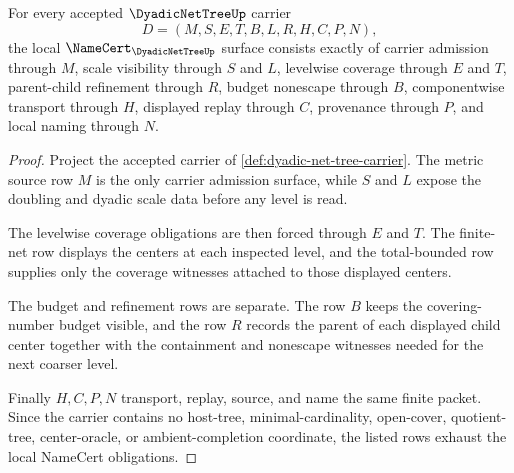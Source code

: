 \begin{theorem}
\label{thm:dyadic-net-tree-namecert-obligations}
For every accepted $\DyadicNetTreeUp$ carrier
$$
D=(M,S,E,T,B,L,R,H,C,P,N),
$$
the local $\NameCert_{\DyadicNetTreeUp}$ surface consists exactly of carrier admission through $M$, scale visibility through $S$ and $L$, levelwise coverage through $E$ and $T$, parent-child refinement through $R$, budget nonescape through $B$, componentwise transport through $H$, displayed replay through $C$, provenance through $P$, and local naming through $N$.
\end{theorem}
\begin{proof}
Project the accepted carrier of \autoref{def:dyadic-net-tree-carrier}. The metric source row $M$ is the only carrier admission surface, while $S$ and $L$ expose the doubling and dyadic scale data before any level is read.

The levelwise coverage obligations are then forced through $E$ and $T$. The finite-net row displays the centers at each inspected level, and the total-bounded row supplies only the coverage witnesses attached to those displayed centers.

The budget and refinement rows are separate. The row $B$ keeps the covering-number budget visible, and the row $R$ records the parent of each displayed child center together with the containment and nonescape witnesses needed for the next coarser level.

Finally $H,C,P,N$ transport, replay, source, and name the same finite packet. Since the carrier contains no host-tree, minimal-cardinality, open-cover, quotient-tree, center-oracle, or ambient-completion coordinate, the listed rows exhaust the local NameCert obligations.
\end{proof}



